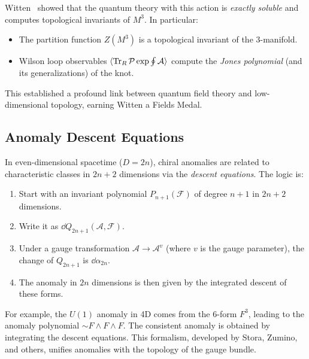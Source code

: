\documentclass[11pt]{article}
\newcommand{\cA}{\mathcal{A}}
\newcommand{\cF}{\mathcal{F}}
\begin{document}
Witten~\cite{Witten1989} showed that the quantum theory with this action is \emph{exactly soluble} and computes topological invariants of \(M^3\). In particular:
\begin{itemize}
    \item The partition function \(Z(M^3)\) is a topological invariant of the 3-manifold.
    \item Wilson loop observables \(\langle \Tr_R \mathcal{P}\exp\oint \cA \rangle\) compute the \emph{Jones polynomial} (and its generalizations) of the knot.
\end{itemize}
This established a profound link between quantum field theory and low-dimensional topology, earning Witten a Fields Medal.

\subsection{Anomaly Descent Equations}
In even-dimensional spacetime (\(D=2n\)), chiral anomalies are related to characteristic classes in \(2n+2\) dimensions via the \emph{descent equations}. The logic is:
\begin{enumerate}
    \item Start with an invariant polynomial \(P_{n+1}(\cF)\) of degree \(n+1\) in \(2n+2\) dimensions.
    \item Write it as \(\dd Q_{2n+1}(\cA,\cF)\).
    \item Under a gauge transformation \(\cA \to \cA^v\) (where \(v\) is the gauge parameter), the change of \(Q_{2n+1}\) is \(\dd \alpha_{2n}\).
    \item The anomaly in \(2n\) dimensions is then given by the integrated descent of these forms.
\end{enumerate}
For example, the \(U(1)\) anomaly in 4D comes from the 6-form \(F^3\), leading to the anomaly polynomial \(\sim F\wedge F\wedge F\). The consistent anomaly is obtained by integrating the descent equations. This formalism, developed by Stora, Zumino, and others, unifies anomalies with the topology of the gauge bundle.
\end{document}
